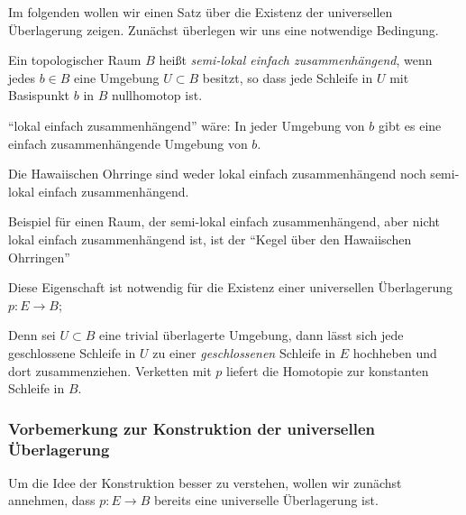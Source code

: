 \documentclass[a4paper,10pt]{scrartcl}
\begin{document}
Im folgenden wollen wir einen Satz über die Existenz der universellen Überlagerung zeigen. Zunächst überlegen wir uns eine notwendige Bedingung.
\begin{df}
 Ein topologischer Raum $B$ heißt \emph{semi-lokal einfach zusammenhängend}, wenn jedes $b\in B$ eine Umgebung $U\subset B$ besitzt, so dass jede Schleife in $U$ mit Basispunkt $b$ in $B$ nullhomotop ist.
\end{df}
\begin{note*}
\item "`lokal einfach zusammenhängend"' wäre: In jeder Umgebung von $b$ gibt es eine einfach zusammenhängende Umgebung von $b$.
\end{note*}
\begin{ex*}
Die  Hawaiischen  Ohrringe sind weder lokal einfach zusammenhängend noch semi-lokal einfach zusammenhängend.
 \begin{figure}[H]
\centering
 \fixme[fig98]
\caption{}
\end{figure}
\end{ex*}

\begin{ex*}
Beispiel für einen Raum, der semi-lokal einfach zusammenhängend, aber nicht lokal einfach zusammenhängend ist, ist der "`Kegel über den Hawaiischen  Ohrringen"'
\begin{figure}[H]
\centering
 \fixme[fig99]
\caption{}
\end{figure}
\end{ex*}
\begin{note*}
 Diese Eigenschaft ist notwendig für die Existenz einer universellen Überlagerung $p: E \to B$;
\begin{figure}[H]
\centering
\fixme[fig100]
\caption{}
\end{figure}
Denn sei $U \subset B$ eine trivial überlagerte Umgebung, dann lässt sich jede geschlossene Schleife in $U$ zu einer \emph{geschlossenen} Schleife in $E$ hochheben und dort zusammenziehen. Verketten mit $p$ liefert die Homotopie zur konstanten Schleife in $B$.
\end{note*}

\subsubsection*{Vorbemerkung zur Konstruktion der universellen Überlagerung}
 Um die Idee der Konstruktion besser zu verstehen, wollen wir zunächst annehmen, dass $p:E\to B$ bereits eine universelle Überlagerung ist.
\end{document}
